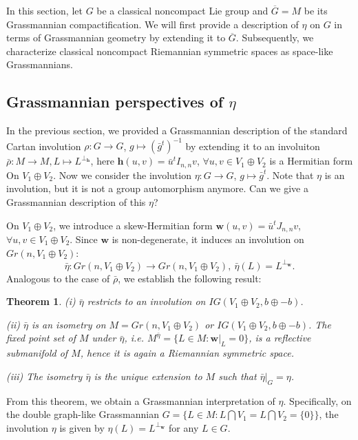 \documentclass{article}
\newtheorem{thm}{Theorem}[section]
\begin{document}
In this section,  let $G$ be a classical noncompact Lie group and $\overline{G}=M $ be its Grassmannian compactification.
We will first provide a description of $\eta$ on $G$ in terms of Grassmannian geometry by extending it to $\overline{G} $.
Subsequently, we characterize classical noncompact Riemannian symmetric spaces as space-like Grassmannians.


\subsection{Grassmannian perspectives of $\eta$}
In the previous section, we provided a Grassmannian description of the standard Cartan involution $\rho: G \rightarrow G$, $g \mapsto (\bar{g}^t)^{-1}$
by extending it to an involuiton $\bar{\rho}: M \rightarrow M, L\mapsto L^{\perp_{\mathbf{h}}}$,  here $\mathbf{h}(u,v)=\bar{u}^tI_{n,n}v$, $\forall u,v \in V_1\oplus V_2$ is a Hermitian form On $V_1\oplus V_2$.
Now we consider the involution  $\eta: G \rightarrow G$, $g \mapsto \bar{g}^t$. Note that $\eta$ is an involution, but it is not a group automorphism anymore. Can we give a Grassmannian description of this $\eta$?

On $V_1\oplus V_2$, we introduce a skew-Hermitian form $\mathbf{w}(u,v)=\bar{u}^tJ_{n,n}v$, $\forall u,v \in V_1\oplus V_2$.
Since $\mathbf{w}$ is non-degenerate, it induces an involution  on $Gr(n, V_1\oplus V_2)$:
\[
\bar{\eta}: Gr(n, V_1\oplus V_2) \rightarrow Gr(n, V_1\oplus V_2), ~  \bar{\eta}(L)= L^{\bot_\mathbf{w}}.
\]
Analogous to the case of  $\bar{\rho}$, we establish the following result:

\begin{thm}
(i) $\bar{\eta}$ restricts to an involution on $IG(V_1 \oplus V_2, b\oplus-b)$.

(ii) $\bar{\eta}$ is an isometry on $M=Gr(n, V_1\oplus V_2)$ or $IG(V_1 \oplus V_2, b\oplus-b)$.
The fixed point set of  $M$ under  $\bar{\eta}$, i.e. $M^{\bar{\eta}}=\{L \in M: \mathbf{w}|_L=0\}$, is a reflective submanifold of  $M$, hence it is again a Riemannian symmetric space.


(iii) The isometry $\bar{\eta}$ is the unique extension to $M$ such that  $\bar{\eta}|_G=\eta$.
\end{thm}

From this theorem, we obtain a Grassmannian interpretation of $\eta$. Specifically, on the double graph-like Grassmannian $G= \{L \in M: L \bigcap V_1=L \bigcap V_2=\{0\}\}$, the involution $\eta$ is given by $\eta(L)=L^{\bot_{\mathbf{w}}}$ for any $L \in G$.
\end{document}
